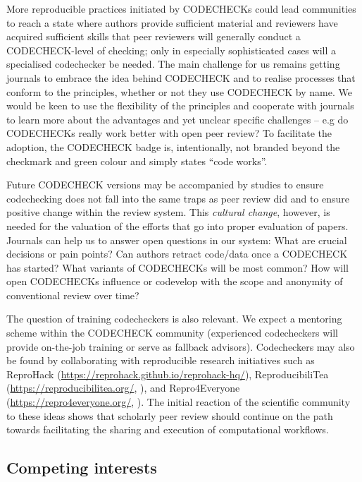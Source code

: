 \documentclass[12pt]{article}
\begin{document}
More reproducible practices initiated by CODECHECKs could lead
communities to reach a state where authors provide sufficient material
and reviewers have acquired sufficient skills that peer reviewers will
generally conduct a CODECHECK-level of checking; only in especially
sophisticated cases will a specialised codechecker be needed.  The
main challenge for us remains getting journals to embrace the idea
behind CODECHECK and to realise processes that conform to the
principles, whether or not they use CODECHECK by name.  We would be
keen to use the flexibility of the principles and cooperate with
journals to learn more about the advantages and yet unclear specific
challenges -- e.g do CODECHECKs really work better with open peer review?  To
facilitate the adoption, the CODECHECK badge is, intentionally, not
branded beyond the checkmark and green colour and simply states ``code
works''.

Future CODECHECK versions may be accompanied by studies to ensure
codechecking does not fall into the same traps as peer review did
\cite{tennant_limitations_2020} and to ensure positive change within
the review system.  This \emph{cultural change}, however, is needed
for the valuation of the efforts that go into proper evaluation of
papers.  Journals can help us to answer open questions in our system: What are
crucial decisions or pain points? Can authors retract code/data once a
CODECHECK has started?  What variants of CODECHECKs will be most
common? How will open CODECHECKs influence or codevelop with the scope
and anonymity of conventional review over time?

The question of training codecheckers is also relevant. We expect a
mentoring scheme within the CODECHECK community (experienced
codecheckers will provide on-the-job training or serve as fallback
advisors). Codecheckers may also be found by collaborating with
reproducible research initiatives such as
ReproHack (\url{https://reprohack.github.io/reprohack-hq/}),
ReproducibiliTea (\url{https://reproducibilitea.org/},
\cite{fitzgibbon_brewing_2020}), and
Repro4Everyone (\url{https://repro4everyone.org/},
\cite{auer_reproducibility_2020}).  The initial reaction of the
scientific community to these ideas shows that scholarly peer review
should continue on the path towards facilitating the sharing and
execution of computational workflows.

\subsection*{Competing interests}
\end{document}
